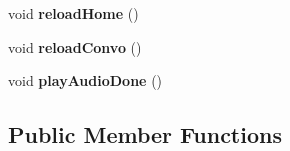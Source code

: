 \begin{DoxyCompactItemize}
\item 
\hypertarget{classHttpManager_a7eae90c3f5e23af35805c68996441f4b}{void {\bfseries reload\-Home} ()}\label{classHttpManager_a7eae90c3f5e23af35805c68996441f4b}

\item 
\hypertarget{classHttpManager_a196c46ed5d6721b6d846f6d2451491dd}{void {\bfseries reload\-Convo} ()}\label{classHttpManager_a196c46ed5d6721b6d846f6d2451491dd}

\item 
\hypertarget{classHttpManager_aba8708814f16b1026dfe1786f08bc332}{void {\bfseries play\-Audio\-Done} ()}\label{classHttpManager_aba8708814f16b1026dfe1786f08bc332}

\end{DoxyCompactItemize}
\subsection*{Public Member Functions}
